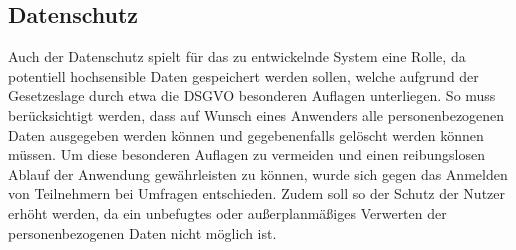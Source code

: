 \subsection{Datenschutz}
Auch der Datenschutz spielt für das zu entwickelnde System eine Rolle, da potentiell hochsensible Daten gespeichert werden sollen, welche aufgrund der Gesetzeslage durch etwa die \ac*{DSGVO}\autocite{rf-dsgvo} besonderen Auflagen unterliegen.
So muss berücksichtigt werden, dass auf Wunsch eines Anwenders alle personenbezogenen Daten ausgegeben werden können und gegebenenfalls gelöscht werden können müssen.
Um diese besonderen Auflagen zu vermeiden und einen reibungslosen Ablauf der Anwendung gewährleisten zu können, wurde sich gegen das Anmelden von Teilnehmern bei Umfragen entschieden.
Zudem soll so der Schutz der Nutzer erhöht werden, da ein unbefugtes oder außerplanmäßiges Verwerten der personenbezogenen Daten nicht möglich ist.
